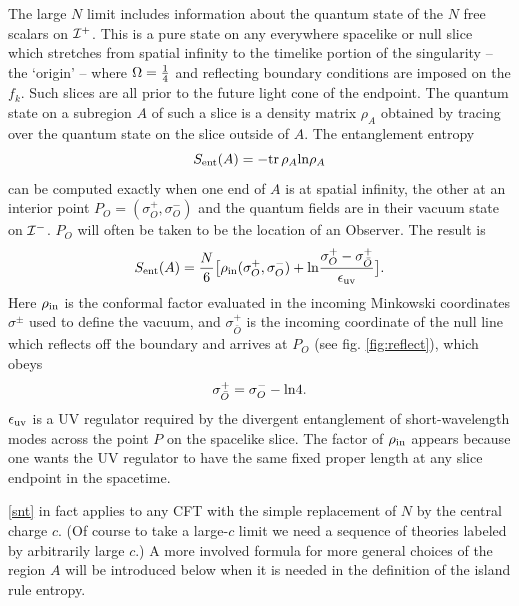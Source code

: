 \documentclass[12pt,oneside,letterpaper]{article}
\newcommand{\be}{\begin{equation}}
\newcommand{\ee}{\end{equation}}
\def\be{\begin{eqnarray}}
\def\ee{\end{eqnarray}}
\let\s=\sigma \let\t=\tau \let\u=\upsilon \let\c=\chi
\def\be{\begin{equation}}
\def\ee{\end{equation}}
\def\euv{\epsilon_{\rm uv}}
\def\log{{\rm ln}}
\numberwithin{equation}{section}
\def \be {\begin{equation}}
\def \ee {\end{equation}}
\begin{document}
The large $N$ limit includes information about the quantum state of the $N$ free scalars on ${\cal I}^+$. This is a pure state on any everywhere spacelike or null slice which 
stretches from spatial infinity to the timelike portion of the singularity -- the `origin' -- where $\Omega={1 \over 4}$ and reflecting  boundary conditions are imposed on the $f_k$. Such slices are all prior to the future light cone of the endpoint. 
The quantum state on a subregion $A$ of such a slice is a density matrix $\rho_A$ obtained by tracing over the quantum  state on the slice outside of $A$.  The entanglement entropy \be S_{\rm ent}(A)=-\mbox{tr}\, \rho_A\log \rho_A \ee
can be computed exactly \cite{Fiola:1994ir} when one end of $A$ is at spatial infinity, the other at an interior point $P_O=( \s^+_O,\s^-_O)$ and the quantum fields are in their vacuum state on ${\cal I}^-$.  $P_O$ will often be taken to be the location of an Observer. The result is \cite{Fiola:1994ir}
\be \label{snt} S_{\rm ent}(A)={N \over 6}\big[ \rho_{\rm in}(\s^+_O,\s^-_O)+\log {\s^+_O-\s^+_{\bar O} \over \euv}\big].\ee
Here  $\rho_{\rm in} $ is the conformal factor evaluated in the incoming Minkowski coordinates $\sigma^\pm$ used to define the vacuum, and $\s^+_{\bar O} $ is the incoming coordinate of the null line which reflects off the boundary and arrives at $P_O$ (see fig. \ref{fig:reflect}), which obeys 
\be \s^+_{\bar O} =\s^-_O-\log 4.\ee  $\euv$ is a UV regulator required by the divergent entanglement of short-wavelength modes across the point $P$ on the spacelike slice. The factor of $\rho_{\rm in}$ appears because one wants the UV regulator to have the same fixed proper length at any slice endpoint in the spacetime. 

\eqref{snt} in fact applies to any CFT with the simple replacement of $N$ by the central charge $c$.  (Of course to take a large-$c$ limit we need a sequence of theories labeled by arbitrarily large $c$.) A more involved formula for more general choices of the region $A$ will be introduced below when it is needed in the definition of the island rule entropy. 
\end{document}
